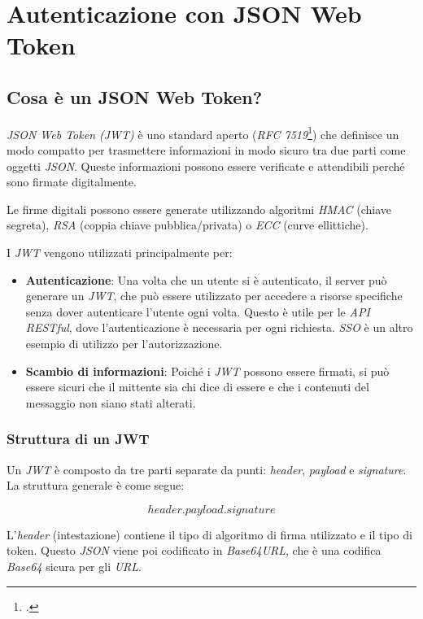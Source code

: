 \chapter{Autenticazione con JSON Web Token}
\label{cap:autenticazione-jwt}


\section{Cosa è un JSON Web Token?}

\emph{JSON Web Token (JWT)} è uno standard aperto (\emph{RFC 7519}\footcite{site:rfc7519}) che definisce un modo compatto per trasmettere informazioni in modo sicuro tra due parti come oggetti \emph{\gls{JSON}}.
Queste informazioni possono essere verificate e attendibili perché sono firmate digitalmente.

Le firme digitali possono essere generate utilizzando algoritmi \emph{\gls{HMAC}} (chiave segreta), \emph{\gls{RSA}} (coppia chiave pubblica/privata) o \emph{\gls{ECC}} (curve ellittiche).

\noindent I \emph{JWT} vengono utilizzati principalmente per:
\begin{itemize}
	\item \textbf{Autenticazione}: Una volta che un utente si è autenticato, il server può generare un \emph{JWT}, che può essere utilizzato per accedere a risorse specifiche senza dover autenticare l'utente ogni volta.
	      Questo è utile per le \emph{API RESTful}, dove l'autenticazione è necessaria per ogni richiesta.
	      \emph{SSO} è un altro esempio di utilizzo per l'autorizzazione.
	\item \textbf{Scambio di informazioni}: Poiché i \emph{JWT} possono essere firmati, si può essere sicuri che il mittente sia chi dice di essere e che i contenuti del messaggio non siano stati alterati.
\end{itemize}

\subsection{Struttura di un JWT}
Un \emph{JWT} è composto da tre parti separate da punti: \emph{header}, \emph{payload} e \emph{signature}.
La struttura generale è come segue:

$$header.payload.signature$$

L'\emph{header} (intestazione) contiene il tipo di algoritmo di firma utilizzato e il tipo di token.
Questo \emph{JSON} viene poi codificato in \emph{Base64URL}, che è una codifica \emph{\gls{Base64}} sicura per gli \emph{\gls{URL}}.


